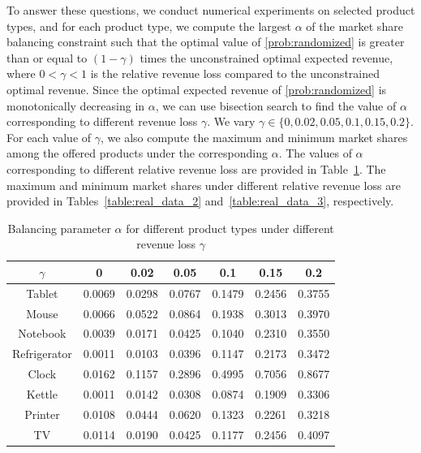\documentclass[mnsc,non-blindrev]{informs3}
\theoremstyle{definition}
\begin{document}
{To answer these questions, we conduct numerical experiments on selected product types, and for each product type, we compute the largest $\alpha$ of the market share balancing constraint such that the optimal value of \ref{prob:randomized} is greater than or equal to $(1-\gamma)$ times the unconstrained optimal expected revenue, where $0<\gamma<1$ is the relative revenue loss compared to the unconstrained optimal revenue. Since the optimal expected revenue of \ref{prob:randomized} is monotonically decreasing in $\alpha$, we can use bisection search to find the value of $\alpha$ corresponding to different revenue loss $\gamma$. We vary $\gamma\in\{0,0.02,0.05,0.1,0.15,0.2\}$. For each value of $\gamma$, we also compute the maximum and minimum market shares among the offered products under the corresponding $\alpha$. The values of $\alpha$ corresponding to different relative revenue loss are provided in Table~\ref{table:real_data_1}. The maximum and minimum market shares under different relative revenue loss are provided in Tables~\ref{table:real_data_2} and~\ref{table:real_data_3}, respectively.

\begin{table}[t]
\centering
{\scriptsize
\begin{tabular}{|c|c c c c c c|}
\hline
$\gamma$&0&0.02&0.05&0.1&0.15&0.2\\
\hline
Tablet&0.0069&0.0298&0.0767&0.1479&0.2456&0.3755\\
Mouse&0.0066&0.0522&0.0864&0.1938&0.3013&0.3970\\
Notebook&0.0039&0.0171&0.0425&0.1040&0.2310&0.3550\\
Refrigerator&0.0011&0.0103&0.0396&0.1147&0.2173&0.3472\\
Clock&0.0162&0.1157&0.2896&0.4995&0.7056&0.8677\\
Kettle&0.0011&0.0142&0.0308&0.0874&0.1909&0.3306\\
Printer&0.0108&0.0444&0.0620&0.1323&0.2261&0.3218\\
TV&0.0114&0.0190&0.0425&0.1177&0.2456&0.4097\\
\hline
\end{tabular}
}
\caption{Balancing parameter $\alpha$ for different product types under different revenue loss $\gamma$}
\label{table:real_data_1}
\end{table}

}
\end{document}

